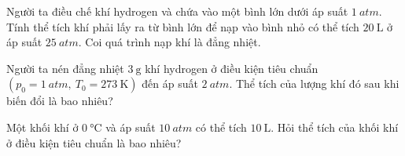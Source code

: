 \begin{ex}
	Người ta điều chế khí hydrogen và chứa vào một bình lớn dưới áp suất $\SI{1}{atm}$. Tính thể tích khí phải lấy ra từ bình lớn để nạp vào bình nhỏ có thể tích $\SI{20}{\liter}$ ở áp suất $\SI{25}{atm}$. Coi quá trình nạp khí là đẳng nhiệt.
\end{ex}
\begin{ex}
Người ta nén đẳng nhiệt $\SI{3}{\gram}$ khí hydrogen ở điều kiện tiêu chuẩn $\left(p_0=\SI{1}{atm},\ T_0=\SI{273}{\kelvin}\right)$ đến áp suất $\SI{2}{atm}$. Thể tích của lượng khí đó sau khi biến đổi là bao nhiêu?	
\end{ex}
\begin{ex}
	Một khối khí ở $\SI{0}{\celsius}$ và áp suất $\SI{10}{atm}$ có thể tích $\SI{10}{\liter}$. Hỏi thể tích của khối khí ở điều kiện tiêu chuẩn là bao nhiêu?
	
\end{ex}
